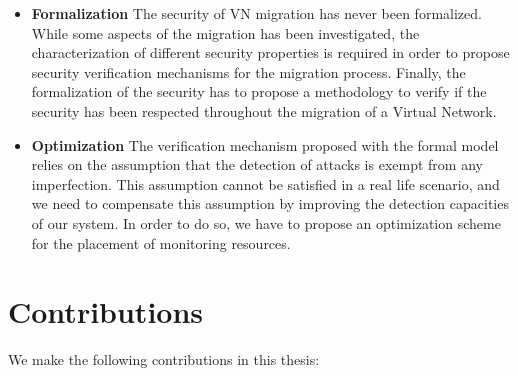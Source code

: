 \begin{itemize}
    \item \textbf{Formalization } The security of VN migration has never been formalized. While some aspects of the migration has been investigated, the characterization of different security properties is required in order to propose security verification mechanisms for the migration process.
    Finally, the formalization of the security has to propose a methodology to verify if the security has been respected throughout the migration of a Virtual Network. 

    \item \textbf{Optimization} The verification mechanism proposed with the formal model relies on the assumption that the detection of attacks is exempt from any imperfection. This assumption cannot be satisfied in a real life scenario, and we need to compensate this assumption by improving the detection capacities of our system.
    In order to do so, we have to propose an optimization scheme for the placement of monitoring resources.
    
    
\end{itemize}

\section{Contributions}
We make the following contributions in this thesis:

